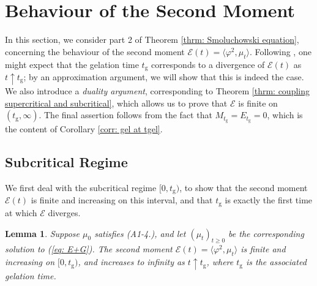 \documentclass[11pt, notitlepage]{article}
\newtheorem{lem}[thm]{Lemma}
\begin{document}
\section{\textbf{Behaviour of the Second Moment}}
\label{sec: finiteness of second moment} In this section, we consider part 2 of Theorem \ref{thrm: Smoluchowski equation}, concerning the behaviour of the second moment $\mathcal{E}(t)=\langle \varphi^2, \mu_t\rangle$. Following \cite{N00}, one might expect that the gelation time $t_\mathrm{g}$ corresponds to a divergence of $\mathcal{E}(t)$ as $t\uparrow t_\mathrm{g}$; by an approximation argument, we will show that this is indeed the case. We also introduce a \emph{duality argument}, corresponding to Theorem \ref{thrm: coupling supercritical and subcritical}, which allows us to prove that $\mathcal{E}$ is finite on $(t_\mathrm{g}, \infty)$. The final assertion follows from the fact that $M_{t_\mathrm{g}}=E_{t_\mathrm{g}}=0$, which is the content of Corollary \ref{corr: gel at tgel}.
\subsection{\textbf{Subcritical Regime}} We first deal with the subcritical regime $[0, t_\mathrm{g})$, to show that the second moment $\mathcal{E}(t)$ is finite and increasing on this interval, and that $t_\mathrm{g}$ is exactly the first time at which $\mathcal{E}$ diverges.
\begin{lem}\label{lemma: second moment before tgel} Suppose $\mu_0$ satisfies (A1-4.), and let $(\mu_t)_{t\ge 0}$ be the corresponding solution to (\ref{eq: E+G}). The second moment $\mathcal{E}(t)=\langle \varphi^2, \mu_t\rangle$ is finite and increasing on $[0, t_\mathrm{g})$, and increases to infinity as $t\uparrow t_\mathrm{g}$, where $t_\mathrm{g}$ is the associated gelation time. \end{lem} 
\end{document}
